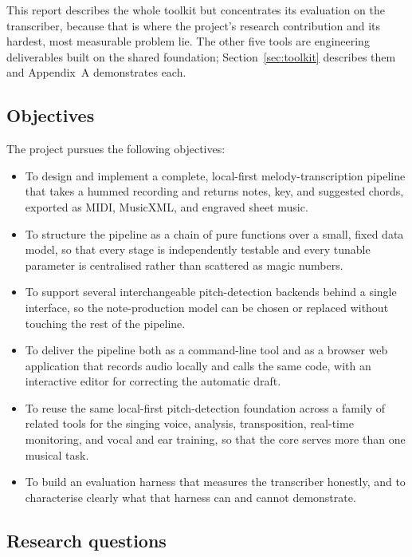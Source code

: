 \documentclass[12pt,a4paper]{article}
\begin{document}
This report describes the whole toolkit but concentrates its evaluation on the
transcriber, because that is where the project's research contribution and its
hardest, most measurable problem lie. The other five tools are engineering
deliverables built on the shared foundation; Section~\ref{sec:toolkit} describes
them and Appendix~A demonstrates each.

\subsection{Objectives}

The project pursues the following objectives:

\begin{itemize}
    \item To design and implement a complete, local-first melody-transcription
    pipeline that takes a hummed recording and returns notes, key, and
    suggested chords, exported as MIDI, MusicXML, and engraved sheet music.
    \item To structure the pipeline as a chain of pure functions over a small,
    fixed data model, so that every stage is independently testable and every
    tunable parameter is centralised rather than scattered as magic numbers.
    \item To support several interchangeable pitch-detection backends behind a
    single interface, so the note-production model can be chosen or replaced
    without touching the rest of the pipeline.
    \item To deliver the pipeline both as a command-line tool and as a browser
    web application that records audio locally and calls the same code, with an
    interactive editor for correcting the automatic draft.
    \item To reuse the same local-first pitch-detection foundation across a
    family of related tools for the singing voice, analysis, transposition,
    real-time monitoring, and vocal and ear training, so that the core serves
    more than one musical task.
    \item To build an evaluation harness that measures the transcriber honestly,
    and to characterise clearly what that harness can and cannot demonstrate.
\end{itemize}

\subsection{Research questions}
\end{document}
